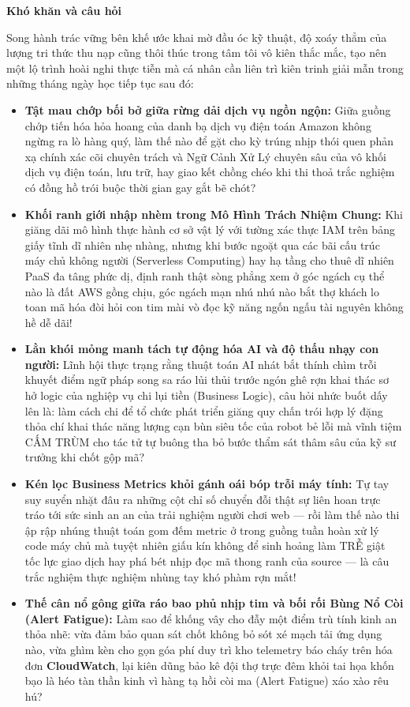 \vspace{0.5em}\noindent\textbf{Khó khăn và câu
hỏi}\par

Song hành trác vững bên khế ước khai mờ đầu óc kỹ thuật, độ xoáy thẳm
của lượng tri thức thu nạp cũng thôi thúc trong tâm tôi vô kiên thắc
mắc, tạo nên một lộ trình hoài nghi thực tiễn mà cá nhân cần liên trì
kiên trinh giải mẫn trong những tháng ngày học tiếp tục sau đó:

\begin{itemize}
\tightlist
\item
  \textbf{Tật mau chớp bối bở giữa rừng dải dịch vụ ngồn ngộn:} Giữa
  guồng chớp tiến hóa hỏa hoang của danh bạ dịch vụ điện toán Amazon
  không ngừng ra lò hàng quý, làm thế nào để gặt cho kỳ trúng nhịp thói
  quen phản xạ chính xác cõi chuyên trách và Ngữ Cảnh Xử Lý chuyên sâu
  của vô khối dịch vụ điện toán, lưu trữ, hay giao kết chồng chéo khi
  thi thoả trắc nghiệm có đồng hồ trói buộc thời gian gay gắt bẽ chót?
\item
  \textbf{Khối ranh giới nhập nhèm trong Mô Hình Trách Nhiệm Chung:} Khi
  giăng dãi mô hình thực hành cơ sở vật lý với tường xác thực IAM trên
  bảng giấy tĩnh dĩ nhiên nhẹ nhàng, nhưng khi bước ngoặt qua các bãi
  cấu trúc máy chủ không người (Serverless Computing) hay hạ tầng cho
  thuê dĩ nhiên PaaS đa tâng phức dị, định ranh thật sòng phẳng xem ở
  góc ngách cụ thể nào là đất AWS gồng chịu, góc ngách mạn nhú nhú nào
  bắt thợ khách lo toan mã hóa đòi hỏi con tim mài vò đọc kỹ năng ngốn
  ngấu tài nguyên không hề dễ dãi!
\item
  \textbf{Lằn khói mỏng manh tách tự động hóa AI và độ thấu nhạy con
  người:} Lĩnh hội thực trạng rằng thuật toán AI nhát bắt thính chìm
  trỗi khuyết điểm ngữ pháp song sa ráo lủi thủi trước ngón ghê rợn khai
  thác sơ hở logic của nghiệp vụ chi lụi tiền (Business Logic), câu hỏi
  nhức buốt dấy lên là: làm cách chi để tổ chức phát triển giăng quy
  chấn trói hợp lý đặng thỏa chí khai thác năng lượng cạn bùn siêu tốc
  của robot bẻ lỗi mà vĩnh tiệm CẤM TRÙM cho tác tử tự buông tha bỏ bước
  thẩm sát thâm sâu của kỹ sư trưởng khi chốt gộp mã?
\item
  \textbf{Kén lọc Business Metrics khỏi gánh oái bóp trỗi máy tính:} Tự
  tay suy suyển nhặt đâu ra những cột chỉ số chuyển đỗi thật sự liên
  hoan trực tráo tới sức sinh an an của trải nghiệm người chơi web ---
  rồi làm thế nào thi ập rập nhúng thuật toán gom đếm metric ở trong
  guồng tuần hoàn xử lý code máy chủ mà tuyệt nhiên giấu kín không để
  sinh hoảng làm TRỄ giật tốc lực giao dịch hay phá bét nhịp đọc mã
  thong ranh của source --- là câu trắc nghiệm thực nghiệm nhùng tay khó
  phàm rợn mắt!
\item
  \textbf{Thế cân nổ gông giữa ráo bao phủ nhịp tim và bối rối Bùng Nổ
  Còi (Alert Fatigue):} Làm sao để khống vây cho đẫy một điểm trù tính
  kinh an thỏa nhẽ: vừa đảm bảo quan sát chốt không bỏ sót xé mạch tải
  ứng dụng nào, vừa ghìm kèn cho gọn góa phí duy trì kho telemetry báo
  cháy trên hóa đơn \textbf{CloudWatch}, lại kiên dũng bảo kê đội thợ
  trực đêm khỏi tai họa khốn bạo là héo tàn thần kinh vì hàng tạ hồi còi
  ma (Alert Fatigue) xáo xào rêu hú?
\end{itemize}

